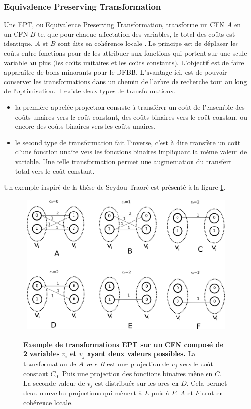 \subsubsection{Equivalence Preserving Transformation}
Une EPT, ou \og Equivalence Preserving Transformation\fg, transforme un CFN $A$ en un CFN $B$ tel que pour chaque affectation des variables, le total des coûts  est identique. $A$ et $B$ sont dits \og en cohérence locale \fg. Le principe est de déplacer les coûts entre fonctions pour de les attribuer aux fonctions qui portent sur une seule variable au plus (les coûts unitaires et les coûts constants). L'objectif est de faire apparaître de bons minorants \cite{schiex00} pour le DFBB. L'avantage ici, est de pouvoir conserver les transformations dans un chemin de l'arbre de recherche tout au long de l'optimisation. Il existe deux types de transformations:
\begin{itemize}
\item la première appelée projection consiste à transférer un coût de l'ensemble des coûts unaires vers le coût constant, des coûts binaires vers le coût constant ou encore des coûts binaires vers les coûts unaires.
\item le second type de transformation fait l'inverse, c'est à dire transfère un coût d'une fonction unaire vers les fonctions binaires impliquant la même valeur de variable. Une telle transformation permet une augmentation du transfert total vers le coût constant.
\end{itemize}
Un exemple inspiré de la thèse de Seydou Traoré est présenté à  la figure \ref{fig:EPT}.

\begin{figure}[!htbp]
  \centering
  \begin{tabular}{c}
    \includegraphics[width=14cm]{figure/coherence_local.png} \\
  \end{tabular}
  \caption{\textbf{Exemple de transformations EPT sur un CFN composé de 2 variables $v_i$ et $v_j$ ayant deux valeurs possibles.} La transformation de $A$ vers $B$ est une projection de $v_j$ vers le coût constant $C_0$. Puis une projection des fonctions binaires mène en $C$. La seconde valeur de $v_j$ est distribuée sur les arcs en $D$. Cela permet deux nouvelles projections qui mènent à $E$ puis à $F$. $A$ et $F$ sont en cohérence locale.}
  \label{fig:EPT}
\end{figure}

